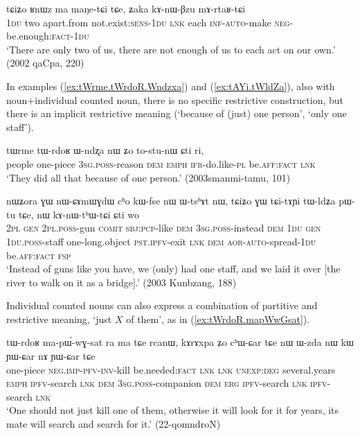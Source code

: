 \begin{exe}
	\ex \label{ex:RnWz.ma.maNetCi}
	\gll  tɕiʑo ʁnɯz ma maŋe-tɕi tɕe, ʑaka kɤ-nɯ-βzu mɤ-rtaʁ-tɕi \\
	\textsc{1du} two apart.from not.exist:\textsc{sens}-\textsc{1du} \textsc{lnk} each \textsc{inf}-\textsc{auto}-make \textsc{neg}-be.enough:\textsc{fact}-\textsc{1du} \\
	\glt  `There are only two of us, there are not enough of us to each act on our own.' (2002 qaCpa, 220)
\end{exe} 

In examples (\ref{ex:tWrme.tWrdoR.Wndzxa}) and (\ref{ex:tAYi.tWldZa}), also with noun+individual counted noun, there is no specific restrictive construction, but there is an implicit restrictive meaning (`because of (just) one person', `only one staff'). 

\begin{exe}
	\ex \label{ex:tWrme.tWrdoR.Wndzxa}
	\gll tɯrme tɯ-rdoʁ ɯ-ndʐa nɯ ʑo to-stu-nɯ ɕti ri, \\
	people one-piece  \textsc{3sg}.\textsc{poss}-reason \textsc{dem} \textsc{emph} \textsc{ifr}-do.like-\textsc{pl} be.\textsc{aff}:\textsc{fact} \textsc{lnk} \\
	\glt `They did all that because of one person.' (2003smanmi-tamu, 101)
\end{exe} 

\begin{exe}
	\ex \label{ex:tAYi.tWldZa}
	\gll nɯʑora ɣɯ nɯ-ɕɤmɯɣdɯ cʰo kɯ-fse nɯ ɯ-tsʰɤt nɯ, tɕiʑo ɣɯ tɕi-tɤɲi tɯ-ldʑa pɯ-tu tɕe, nɯ kɤ-nɯ-tʰɯ-tɕi ɕti wo \\
	\textsc{2pl} \textsc{gen} \textsc{2pl}.\textsc{poss}-gun \textsc{comit} \textsc{sbj}:\textsc{pcp}-like \textsc{dem} \textsc{3sg}.\textsc{poss}-instead \textsc{dem}  \textsc{1du} \textsc{gen} \textsc{1du}.\textsc{poss}-staff one-long.object \textsc{pst}.\textsc{ipfv}-exit \textsc{lnk} \textsc{dem} \textsc{aor}-\textsc{auto}-spread-\textsc{1du} be.\textsc{aff}:\textsc{fact} \textsc{fsp} \\
	\glt `Instead of guns like you have, we (only) had one staff, and we laid it over [the river to walk on it as a bridge].' (2003 Kunbzang, 188)
\end{exe} 

Individual counted nouns can also express a combination of partitive and restrictive meaning, `just $X$ of them', as in (\ref{ex:tWrdoR.mapWwGsat}).

\begin{exe}
	\ex \label{ex:tWrdoR.mapWwGsat}
	\gll 
	tɯ-rdoʁ ma-pɯ́-wɣ-sat ra ma tɕe rcanɯ, kɤrɤxpa ʑo cʰɯ-ɕar tɕe nɯ ɯ-zda nɯ kɯ ɲɯ-ɕar nɤ ɲɯ-ɕar tɕe \\
	one-piece \textsc{neg}.\textsc{imp}-\textsc{pfv}-\textsc{inv}-kill be.needed:\textsc{fact} \textsc{lnk} \textsc{lnk} \textsc{unexp}:\textsc{deg} several.years \textsc{emph} \textsc{ipfv}-search \textsc{lnk} \textsc{dem} \textsc{3sg}.\textsc{poss}-companion \textsc{dem} \textsc{erg} \textsc{ipfv}-search \textsc{lnk} \textsc{ipfv}-search \textsc{lnk} \\
	\glt `One should not just kill one of them, otherwise it will look for it for years, its mate will search and search for it.' (22-qomndroN)
\end{exe}

